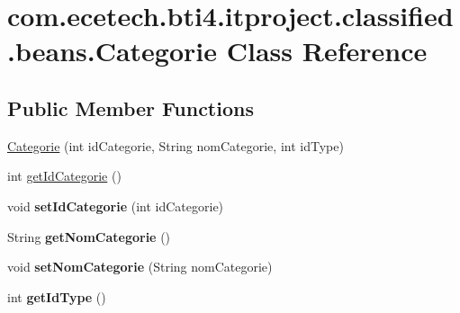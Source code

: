 \hypertarget{classcom_1_1ecetech_1_1bti4_1_1itproject_1_1classified_1_1beans_1_1_categorie}{}\section{com.\+ecetech.\+bti4.\+itproject.\+classified.\+beans.\+Categorie Class Reference}
\label{classcom_1_1ecetech_1_1bti4_1_1itproject_1_1classified_1_1beans_1_1_categorie}
\subsection*{Public Member Functions}
\begin{DoxyCompactItemize}
\item 
\hyperlink{classcom_1_1ecetech_1_1bti4_1_1itproject_1_1classified_1_1beans_1_1_categorie_a151c5e769ad87b8b5cf882e9d5b6b8d6}{Categorie} (int id\+Categorie, String nom\+Categorie, int id\+Type)
\item 
int \hyperlink{classcom_1_1ecetech_1_1bti4_1_1itproject_1_1classified_1_1beans_1_1_categorie_a70d771b7a2c6d24807b4ad8a7599dfb3}{get\+Id\+Categorie} ()
\item 
void {\bfseries set\+Id\+Categorie} (int id\+Categorie)\hypertarget{classcom_1_1ecetech_1_1bti4_1_1itproject_1_1classified_1_1beans_1_1_categorie_a7cfebd4ed0c6170eb8eb7e629d667d64}{}\label{classcom_1_1ecetech_1_1bti4_1_1itproject_1_1classified_1_1beans_1_1_categorie_a7cfebd4ed0c6170eb8eb7e629d667d64}

\item 
String {\bfseries get\+Nom\+Categorie} ()\hypertarget{classcom_1_1ecetech_1_1bti4_1_1itproject_1_1classified_1_1beans_1_1_categorie_a5f5d43367d9964e07a45492c036fe49f}{}\label{classcom_1_1ecetech_1_1bti4_1_1itproject_1_1classified_1_1beans_1_1_categorie_a5f5d43367d9964e07a45492c036fe49f}

\item 
void {\bfseries set\+Nom\+Categorie} (String nom\+Categorie)\hypertarget{classcom_1_1ecetech_1_1bti4_1_1itproject_1_1classified_1_1beans_1_1_categorie_aece9e65b0b2001cde88cdc99ad00206b}{}\label{classcom_1_1ecetech_1_1bti4_1_1itproject_1_1classified_1_1beans_1_1_categorie_aece9e65b0b2001cde88cdc99ad00206b}

\item 
int {\bfseries get\+Id\+Type} ()\hypertarget{classcom_1_1ecetech_1_1bti4_1_1itproject_1_1classified_1_1beans_1_1_categorie_a75d6febe1021333b087a7e98e764e053}{}\label{classcom_1_1ecetech_1_1bti4_1_1itproject_1_1classified_1_1beans_1_1_categorie_a75d6febe1021333b087a7e98e764e053}


\end{DoxyCompactItemize}
